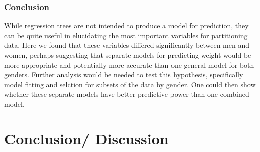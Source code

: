 \documentclass[11pt]{article}\usepackage[]{graphicx}\usepackage[]{color}
\begin{document}
\subsubsection{Conclusion}
While regression trees are not intended to produce a model for prediction, they can be quite useful in elucidating the most important variables for partitioning data. Here we found that these variables differed significantly between men and women, perhaps suggesting that separate models for predicting weight would be more appropriate and potentially more accurate than one general model for both genders. Further analysis would be needed to test this hypothesis, specifically model fitting and selction for subsets of the data by gender. One could then show whether these separate models have better predictive power than one combined model.


\newpage

\section{Conclusion/ Discussion}
\end{document}
